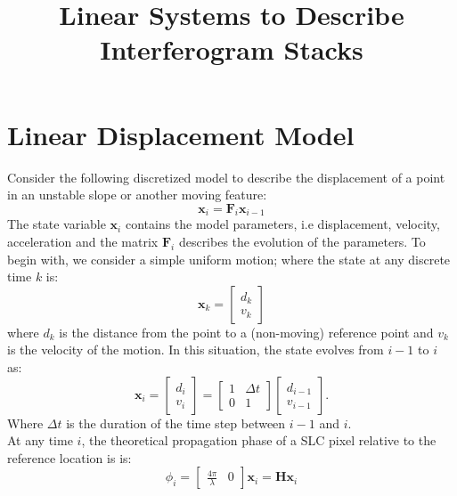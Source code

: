 \documentclass{article}
\title{Linear Systems to Describe Interferogram Stacks}
\begin{document}
\maketitle
\section{Linear Displacement Model}\label{sec:displacement_model}
Consider the following discretized model to describe the displacement of a point in an unstable slope or another moving feature:
\begin{equation}
	\mathbf{x}_i = \mathbf{F}_i \mathbf{x}_{i-1}
\end{equation}
The state variable $\mathbf{x}_i$ contains the model parameters, i.e displacement, velocity, acceleration and the matrix $\mathbf{F}_i$ describes the evolution of the parameters. To begin with, we consider a simple uniform motion; where the state at any discrete time $k$ is:
\begin{equation}
\mathbf{x}_k = 
	\begin{bmatrix}
		d_{k}\\
		v_{k}
	\end{bmatrix}
\end{equation}
where $d_{k}$ is the distance from the point to a (non-moving) reference point and $v_k$ is the velocity of the motion.
In this situation, the state evolves from $i-1$ to $i$ as:
\begin{equation}
	\mathbf{x}_i = 
		\begin{bmatrix}
			d_{i}\\
			v_{i}
		\end{bmatrix} =
		\begin{bmatrix}
		1 & \Delta t\\
		0 & 1
		\end{bmatrix}
		\begin{bmatrix}
			d_{i-1}\\
			v_{i-1}
		\end{bmatrix}.
\end{equation}
Where $\Delta t$ is the duration of the time step between $i-1$ and $i$.\\
At any time $i$, the theoretical propagation phase of a SLC pixel relative to the reference location is is:
\begin{equation}
	\phi_i = \begin{bmatrix} \frac{4\pi}{\lambda} & 0 \end{bmatrix} \mathbf{x}_i = \mathbf{H} \mathbf{x}_i
\end{equation}
\end{document}
